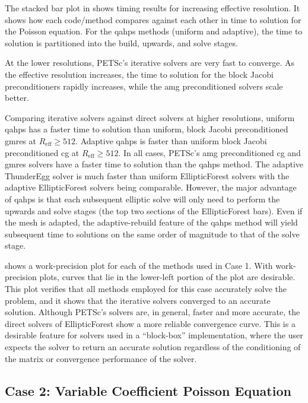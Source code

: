 The stacked bar plot in  shows timing results for increasing effective resolution. It shows how each code/method compares against each other in time to solution for the Poisson equation. For the \gls{qahps} methods (uniform and adaptive), the time to solution is partitioned into the build, upwards, and solve stages.

At the lower resolutions, PETSc's iterative solvers are very fast to converge. As the effective resolution increases, the time to solution for the block Jacobi preconditioners rapidly increases, while the \gls{amg} preconditioned solvers scale better.

Comparing iterative solvers against direct solvers at higher resolutions, uniform \gls{qahps} has a faster time to solution than uniform, block Jacobi preconditioned \gls{gmres} at $R_{\text{eff}} \ge 512$. Adaptive \gls{qahps} is faster than uniform block Jacobi preconditioned \gls{cg} at $R_{\text{eff}} \ge 512$. In all cases, PETSc's \gls{amg} preconditioned \gls{cg} and \gls{gmres} solvers have a faster time to solution than the \gls{qahps} method. The adaptive ThunderEgg solver is much faster than uniform EllipticForest solvers with the adaptive EllipticForest solvers being comparable. However, the major advantage of \gls{qahps} is that each subsequent elliptic solve will only need to perform the upwards and solve stages (the top two sections of the EllipticForest bars). Even if the mesh is adapted, the adaptive-rebuild feature of the \gls{qahps} method will yield subsequent time to solutions on the same order of magnitude to that of the solve stage.

 shows a work-precision plot for each of the methods used in Case 1. With work-precision plots, curves that lie in the lower-left portion of the plot are desirable. This plot verifies that all methods employed for this case accurately solve the problem, and it shows that the iterative solvers converged to an accurate solution. Although PETSc's solvers are, in general, faster and more accurate, the direct solvers of EllipticForest show a more reliable convergence curve. This is a desirable feature for solvers used in a ``block-box'' implementation, where the user expects the solver to return an accurate solution regardless of the conditioning of the matrix or convergence performance of the solver.

\subsection{Case 2: Variable Coefficient Poisson Equation}
\label{sub:case2}


